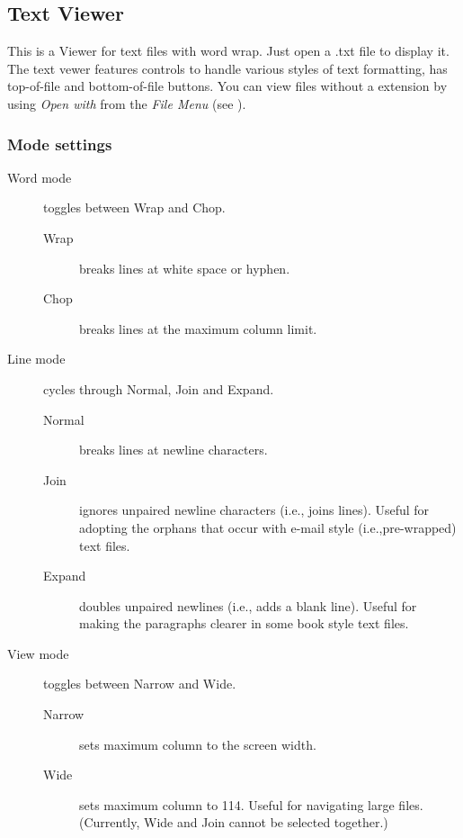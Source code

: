 \subsection{Text Viewer}
This is a Viewer for text files with word wrap. Just open a .txt file to
display it. The text vewer features controls to handle various styles of text
formatting, has top{}-of{}-file and bottom{}-of{}-file buttons. You can view
files without a  extension by using \emph{Open with} from the
\emph{File Menu} (see ).

\subsubsection{Mode settings}

\begin{description}
\item[Word mode] toggles between Wrap and Chop.
    \begin{description}
        \item[Wrap] breaks lines at white space or hyphen.
        \item[Chop] breaks lines at the maximum column limit.
    \end{description}  
\item[Line mode] cycles through Normal, Join and Expand.
    \begin{description}
        \item[Normal] breaks lines at newline characters.
        \item[Join] ignores unpaired newline characters (i.e., joins lines).
        Useful for adopting the orphans that occur with e{}-mail style
        (i.e.,pre{}-wrapped) text files.
        \item[Expand] doubles unpaired newlines (i.e., adds a blank line).
        Useful for making the paragraphs clearer in some book style text files.
    \end{description}
\item[View mode] toggles between Narrow and Wide.
    \begin{description}
        \item[Narrow] sets maximum column to the screen width.
        \item[Wide] sets maximum column to 114. Useful for navigating large files. (Currently, Wide and Join cannot be selected together.)
    \end{description}
\end{description}
